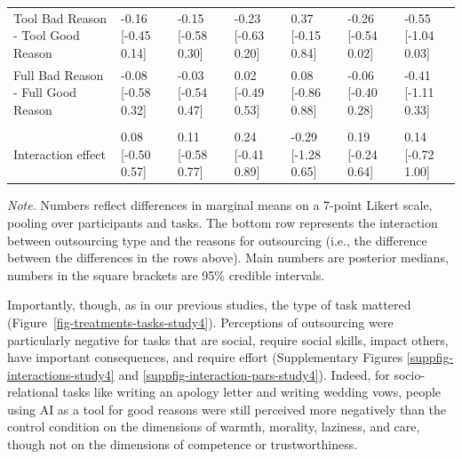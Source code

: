 \documentclass[
  man,
  floatsintext,
  longtable,
  nolmodern,
  notxfonts,
  notimes,
  colorlinks=true,linkcolor=blue,citecolor=blue,urlcolor=blue]{apa7}
\begin{document}
\begin{landscape}
\begin{table}
\begin{tabular}{lllllll}
\hspace{1em}Tool Bad Reason - Tool Good Reason & -0.16 [-0.45 0.14] & -0.15 [-0.58 0.30] & -0.23 [-0.63 0.20] & 0.37 [-0.15 0.84] & -0.26 [-0.54 0.02] & -0.55 [-1.04 0.03]\\
\hspace{1em}Full Bad Reason - Full Good Reason & -0.08 [-0.58 0.32] & -0.03 [-0.54 0.47] & 0.02 [-0.49 0.53] & 0.08 [-0.86 0.88] & -0.06 [-0.40 0.28] & -0.41 [-1.11 0.33]\\
\addlinespace[0.3em]
\multicolumn{7}{l}{\textbf{Interaction effect}}\\
\hspace{1em}Interaction effect & 0.08 [-0.50 0.57] & 0.11 [-0.58 0.77] & 0.24 [-0.41 0.89] & -0.29 [-1.28 0.65] & 0.19 [-0.24 0.64] & 0.14 [-0.72 1.00]\\
\bottomrule
\end{tabular}
\endgroup{}\vspace{40pt}

\vspace{-20pt}
\noindent \emph{Note.} Numbers reflect differences in marginal means on
a 7-point Likert scale, pooling over participants and tasks. The bottom
row represents the interaction between outsourcing type and the reasons
for outsourcing (i.e., the difference between the differences in the
rows above). Main numbers are posterior medians, numbers in the square
brackets are 95\% credible intervals.

\end{table}

\end{landscape}

Importantly, though, as in our previous studies, the type of task
mattered (Figure~\ref{fig-treatments-tasks-study4}). Perceptions of
outsourcing were particularly negative for tasks that are social,
require social skills, impact others, have important consequences, and
require effort (Supplementary Figures \ref{suppfig-interactions-study4}
and \ref{suppfig-interaction-pars-study4}). Indeed, for socio-relational
tasks like writing an apology letter and writing wedding vows, people
using AI as a tool for good reasons were still perceived more negatively
than the control condition on the dimensions of warmth, morality,
laziness, and care, though not on the dimensions of competence or
trustworthiness.
\end{document}
